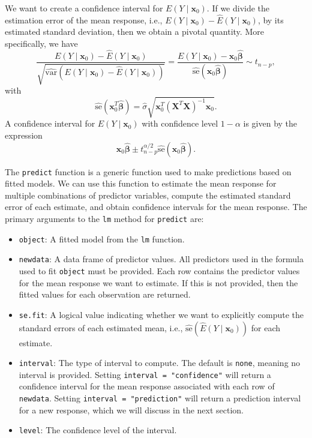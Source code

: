 \documentclass[
]{book}
\providecommand{\tightlist}{%
  \setlength{\itemsep}{0pt}\setlength{\parskip}{0pt}}
\theoremstyle{definition}
\theoremstyle{definition}
\theoremstyle{definition}
\theoremstyle{definition}
\theoremstyle{remark}
\begin{document}
We want to create a confidence interval for \(E(Y\mid \mathbf{x}_0)\). If we divide the estimation error of the mean response, i.e., \(E(Y\mid \mathbf{x}_0)-\hat{E}(Y\mid \mathbf{x}_0)\), by its estimated standard deviation, then we obtain a pivotal quantity. More specifically, we have \[
\frac{E(Y\mid \mathbf{x}_0)-\hat{E}(Y\mid \mathbf{x}_0)}{\sqrt{\hat{\mathrm{var}}\left(E(Y\mid \mathbf{x}_0)-\hat{E}(Y\mid \mathbf{x}_0)\right)}} = \frac{E(Y\mid \mathbf{x}_0)- \mathbf{x}_0 \hat{\boldsymbol{\beta}}}{ \hat{\mathrm{se}}(\mathbf{x}_0\hat{\boldsymbol{\beta}})}\sim t_{n-p},
\]
with
\[
\hat{\mathrm{se}}(\mathbf{x}_0^T\hat{\boldsymbol{\beta}})=\hat{\sigma}\sqrt{\mathbf{x}_0^T (\mathbf{X}^T \mathbf{X})^{-1}\mathbf{x}_0}. \label{eq:sehat-est-mean}
\]
A confidence interval for \(E(Y\mid \mathbf{x}_0)\) with confidence
level \(1-\alpha\) is given by the expression
\[
\mathbf{x}_0\hat{\boldsymbol{\beta}} \pm t^{\alpha/2}_{n-p} \hat{\mathrm{se}}(\mathbf{x}_0\hat{\boldsymbol{\beta}}). \label{eq:t-ci-mean-response}
\]

The \texttt{predict} function is a generic function used to make predictions
based on fitted models. We can use this function to estimate the mean
response for multiple combinations of predictor variables, compute the
estimated standard error of each estimate, and obtain confidence
intervals for the mean response. The primary arguments to the \texttt{lm}
method for \texttt{predict} are:

\begin{itemize}
\tightlist
\item
  \texttt{object}: A fitted model from the \texttt{lm} function.
\item
  \texttt{newdata}: A data frame of predictor values. All predictors used in the formula used to fit \texttt{object} must be provided. Each row contains the predictor values for the mean response we want to estimate. If this is not provided, then the fitted values for each observation are returned.
\item
  \texttt{se.fit}: A logical value indicating whether we want to explicitly
  compute the standard errors of each estimated mean, i.e.,
  \(\hat{\mathrm{se}}(\hat{E}(Y\mid \mathbf{x}_0))\) for each estimate.
\item
  \texttt{interval}: The type of interval to compute. The default is \texttt{none},
  meaning no interval is provided. Setting \texttt{interval\ =\ "confidence"}
  will return a confidence interval for the mean response associated
  with each row of \texttt{newdata}. Setting \texttt{interval\ =\ "prediction"} will
  return a prediction interval for a new response, which we will
  discuss in the next section.
\item
  \texttt{level}: The confidence level of the interval.
\end{itemize}
\end{document}

